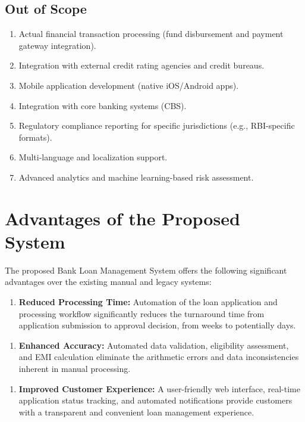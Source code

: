 \documentclass[12pt,a4paper,oneside]{report}
\begin{document}
\subsection{Out of Scope}

\begin{enumerate}
  \item Actual financial transaction processing (fund disbursement and payment gateway integration).
  \item Integration with external credit rating agencies and credit bureaus.
  \item Mobile application development (native iOS/Android apps).
  \item Integration with core banking systems (CBS).
  \item Regulatory compliance reporting for specific jurisdictions (e.g., RBI-specific formats).
  \item Multi-language and localization support.
  \item Advanced analytics and machine learning-based risk assessment.
\end{enumerate}

\section{Advantages of the Proposed System}

The proposed Bank Loan Management System offers the following significant advantages over the existing manual and legacy systems:

\begin{enumerate}
  \item \textbf{Reduced Processing Time:} Automation of the loan application and processing workflow significantly reduces the turnaround time from application submission to approval decision, from weeks to potentially days.
\end{enumerate}

\begin{enumerate}
  \item \textbf{Enhanced Accuracy:} Automated data validation, eligibility assessment, and EMI calculation eliminate the arithmetic errors and data inconsistencies inherent in manual processing.
\end{enumerate}

\begin{enumerate}
  \item \textbf{Improved Customer Experience:} A user-friendly web interface, real-time application status tracking, and automated notifications provide customers with a transparent and convenient loan management experience.
\end{enumerate}
\end{document}
